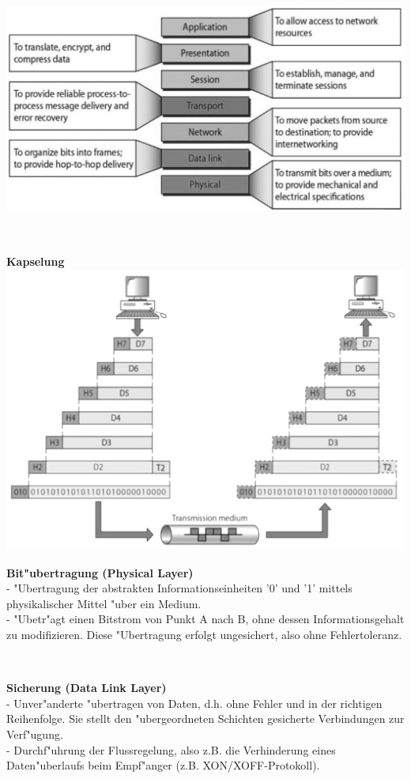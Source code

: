  \begin{minipage}{10.5cm}
 	\includegraphics[width=10 cm]{images/OSI-Layer}
 \end{minipage}
 \begin{minipage}{0.5cm}
 	\-\
 \end{minipage}
 \begin{minipage}{7.5cm}
 	\textbf{Kapselung}\\
 	\includegraphics[width=7 cm]{images/OSI-Kapselung}
 \end{minipage}
 
 
 \begin{minipage}[t]{9cm}
 	\textbf{Bit"ubertragung (Physical Layer)}\\
	- "Ubertragung der abstrakten Informationseinheiten '0' und '1' mittels physikalischer Mittel "uber ein Medium.\\
    - "Ubetr"agt einen Bitstrom von Punkt A nach B, ohne dessen Informationsgehalt zu modifizieren. Diese "Ubertragung erfolgt ungesichert, also ohne Fehlertoleranz.
 \end{minipage}
 \begin{minipage}[t]{0.5cm}
 	\-\
 \end{minipage}
 \begin{minipage}[t]{9cm}
 	\textbf{Sicherung (Data Link Layer)}\\
	- Unver"anderte "ubertragen von Daten, d.h. ohne Fehler und in der richtigen Reihenfolge. Sie stellt den "ubergeordneten Schichten gesicherte Verbindungen zur Verf"ugung.\\
	- Durchf"uhrung der Flussregelung, also z.B. die Verhinderung eines Daten"uberlaufs beim Empf"anger (z.B. XON/XOFF-Protokoll).
 \end{minipage}
 
